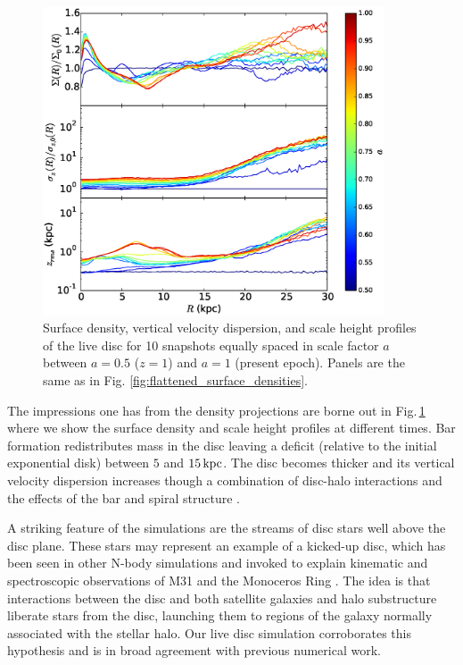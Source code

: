 \begin{figure}\centering 
 \includegraphics[width=0.9\textwidth]{../figures/surface_densities.eps}

  \caption{Surface density, vertical velocity dispersion, and scale
    height profiles of the live disc for 10 snapshots equally spaced
    in scale factor $a$ between $a=0.5$ ($z=1$) and $a=1$ (present
    epoch).  Panels are the same as in
    Fig. \ref{fig:flattened_surface_densities}.}
\label{fig:surface_densities} 
\end{figure}

The impressions one has from the density projections are borne out in
Fig.\,\ref{fig:surface_densities} where we show the surface density
and scale height profiles at different times.  Bar formation
redistributes mass in the disc leaving a deficit (relative to the
initial exponential disk) between $5$ and $15\,{\rm kpc}$.  The disc
becomes thicker and its vertical velocity dispersion increases though
a combination of disc-halo interactions and the effects of the bar and
spiral structure \citep{gauthier2006, dubinski2008, kazantzidis2008}.

A striking feature of the simulations are the streams of disc stars
well above the disc plane.  These stars may represent an example of a
kicked-up disc, which has been seen in other N-body simulations
\citep{PurcellHeatedDisk, McCarthyHeatedDisk} and invoked to explain
kinematic and spectroscopic observations of M31
\citep{DormanKickedUpDisk} and the Monoceros Ring \citep[e.g.][]{monoceros_disc,ibata_et_al_2003}. The idea is that interactions between the
disc and both satellite galaxies and halo substructure liberate stars
from the disc, launching them to regions of the galaxy normally
associated with the stellar halo.  Our live disc simulation
corroborates this hypothesis and is in broad agreement with previous
numerical work. 

